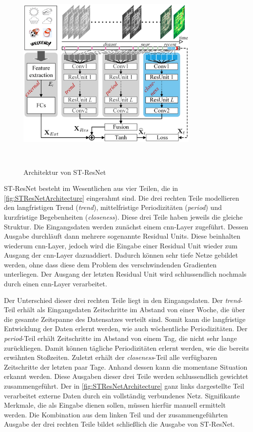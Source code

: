 \begin{figure}[h]
    \centering
    \includegraphics[width=0.8\textwidth,height=10cm,keepaspectratio=true]{content/images/STResNetArchitecture.png}
    \caption{Architektur von ST-ResNet \cite[Figure 3]{STResNetOriginal}}
    \label{fig:STResNetArchitecture}
\end{figure}

ST-ResNet besteht im Wesentlichen aus vier Teilen, die in \autoref{fig:STResNetArchitecture} eingerahmt sind.
Die drei rechten Teile modellieren den langfristigen Trend (\emph{trend}), mittelfristige Periodizitäten (\emph{period}) und kurzfristige Begebenheiten (\emph{closeness}).
Diese drei Teile haben jeweils die gleiche Struktur.
Die Eingangsdaten werden zunächst einem \acrshort{cnn}-Layer zugeführt.
Dessen Ausgabe durchläuft dann mehrere sogenannte Residual Units.
Diese beinhalten wiederum \acrshort{cnn}-Layer, jedoch wird die Eingabe einer Residual Unit wieder zum Ausgang der \acrshort{cnn}-Layer dazuaddiert.
Dadurch können sehr tiefe Netze gebildet werden, ohne dass diese dem Problem des verschwindenden Gradienten unterliegen.
Der Ausgang der letzten Residual Unit wird schlussendlich nochmals durch einen \acrshort{cnn}-Layer verarbeitet.

Der Unterschied dieser drei rechten Teile liegt in den Eingangsdaten.
Der \emph{trend}-Teil erhält als Eingangsdaten Zeitschritte im Abstand von einer Woche, die über die gesamte Zeitspanne des Datensatzes verteilt sind.
Somit kann die langfristige Entwicklung der Daten erlernt werden, wie auch wöchentliche Periodizitäten.
Der \emph{period}-Teil erhält Zeitschritte im Abstand von einem Tag, die nicht sehr lange zurückliegen.
Damit können tägliche Periodizitäten erlernt werden, wie die bereits erwähnten Stoßzeiten.
Zuletzt erhält der \emph{closeness}-Teil alle verfügbaren Zeitschritte der letzten paar Tage.
Anhand dessen kann die momentane Situation erkannt werden.
Diese Ausgaben dieser drei Teile werden schlussendlich gewichtet zusammengeführt.
Der in \autoref{fig:STResNetArchitecture} ganz links dargestellte Teil verarbeitet externe Daten durch ein vollständig verbundenes Netz.
Signifikante Merkmale, die als Eingabe dienen sollen, müssen hierfür manuell ermittelt werden.
Die Kombination aus dem linken Teil und der zusammengeführten Ausgabe der drei rechten Teile bildet schließlich die Ausgabe von ST-ResNet.

